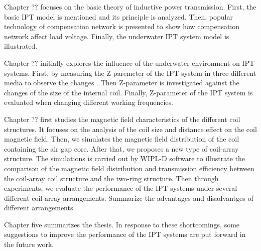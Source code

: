 Chapter ?? focuses on the basic theory of inductive power transmission. 
First, the basic IPT model is mentioned and its principle is analyzed. 
Then, popular technology of compensation network is presented to show how compensation network affect load voltage. Finally, the underwater IPT system model is illustrated.

Chapter ?? initially explores the influence of the underwater environment on IPT systems. 
First, by measuring the Z-paremeter of the IPT system in three different media to observe the changes . 
Then Z-parameter is investigated against the changes of the size of the internal coil. 
Finally, Z-parameter of the IPT system is evaluated when changing different working frequencies.

Chapter ?? first studies the magnetic field characteristics of the different coil structures.
It focuses on the analysis of the coil size and distance effect on the coil magnetic field.
Then, we simulates the magnetic field distribution of the coil containing the air gap core.
After that, we proposes a new type of coil-array structure. 
The simulations is carried out by WIPL-D software to illustrate the comparison of the magnetic field distribution and transmission efficiency between the coil-array coil structure and the two-ring structure. 
Then through experiments, we evaluate the performance of the IPT systems under several different coil-array arrangements. Summarize the advantages and disadvantges of different arrangements.

Chapter five summarizes the thesis. 
In response to these shortcomings, some suggestions to improve the performance of the IPT systems are put forward in the future work.








